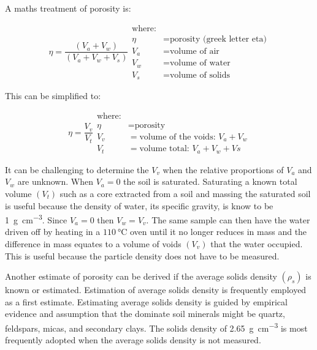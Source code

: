 \documentclass{book}
\begin{document}
A maths treatment of porosity is:

\begin{equation}
    \eta = \frac{\left(V_a + V_w\right)}{\left(V_a + V_w + V_s\right)}
    \begin{aligned}
        \text{where:}\\
        \eta &= \text{porosity (greek letter eta)}\\
        V_a &= \text{volume of air}\\
        V_w &= \text{volume of water}\\
        V_s &= \text{volume of solids}
    \end{aligned}
\end{equation}

This can be simplified to:

\begin{equation}
    \eta = \frac{V_v}{V_t}
    \begin{aligned}
        \text{where:}\\
        \eta &= \text{porosity}\\
        V_v &= \text{volume of the voids}:\,V_a+V_w\\
        V_t &= \text{volume total}:\,V_a+V_w+Vs
    \end{aligned}
\end{equation}

It can be challenging to determine the $V_v$ when the relative proportions of $V_a$ and $V_w$ are unknown. When $V_a = 0$ the soil is saturated. Saturating a known total volume $\left(V_t\right)$  such as a core extracted from a soil and massing the saturated soil is useful because the density of water, its specific gravity, is know to be \qty{1}{\gram\per\cubic\centi\metre}. Since $V_a=0$ then $V_w=V_v$. The same sample can then have the water driven off by heating in a $\qty{110}{\degreeCelsius}$ oven until it no longer reduces in mass and the difference in mass equates to a volume of voids $\left(V_v\right)$ that the water occupied. This is useful because the particle density does not have to be measured.

Another estimate of porosity can be derived if the average solids density $\left(\rho_s\right)$ is known or estimated. Estimation of average solids density is frequently employed as a first estimate. Estimating average solids density is guided by empirical evidence and assumption that the dominate soil minerals might be quartz, feldspars, micas, and secondary clays. The solids density of \qty{2.65}{\gram\per\cubic\centi\metre} is most frequently adopted when the average solids density is not measured.
\end{document}
